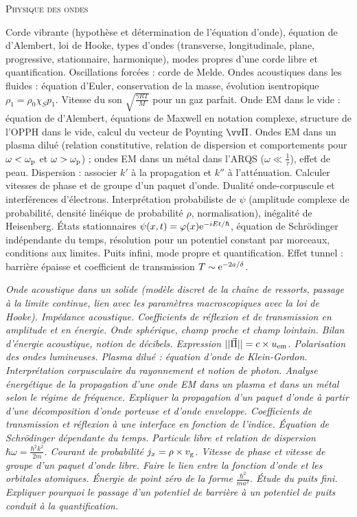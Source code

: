 \documentclass[12pt,fancy]{cours}
\begin{document}
\begin{enumerate}
\medskip
\item \textsc{Physique des ondes}
\item[\Note] Corde vibrante (hypothèse et détermination de l'équation d'onde), équation de d'Alembert, loi de Hooke, types d'ondes (transverse, longitudinale, plane, progressive, stationnaire, harmonique), modes propres d'une corde libre et quantification. Oscillations forcées : corde de Melde. Ondes acoustiques dans les fluides : équation d'Euler, conservation de la masse, évolution isentropique $\rho_1=\rho_0\chi_S p_1$. Vitesse du son $\sqrt{\frac{\gamma RT}{M}}$ pour un gaz parfait.  Onde EM dans le vide : équation de d'Alembert, équations de Maxwell en notation complexe, structure de l'OPPH dans le vide, calcul du vecteur de Poynting $\Poy$. Ondes EM dans un plasma dilué (relation constitutive, relation de dispersion et comportements pour $\omega<\omega_{\rm{p}}$ et $\omega>\omega_{\rm{p}}$) ; ondes EM dans un métal dans l'ARQS ($\omega\ll \frac{1}{\tau}$), effet de peau. Dispersion : associer $k'$ à la propagation et $k''$ à l'atténuation. Calculer vitesses de phase et de groupe d'un paquet d'onde. Dualité onde-corpuscule et interférences d'électrons. Interprétation probabiliste de $\psi$ (amplitude complexe de probabilité, densité linéique de probabilité $\rho$, normalisation), inégalité de Heisenberg. États stationnaires $\psi(x,t)=\varphi(x)\mathrm{e}^{-iEt/\hbar}$, équation de Schrödinger indépendante du temps, résolution pour un potentiel constant par morceaux, conditions aux limites. Puits infini, mode propre et quantification. Effet tunnel : barrière épaisse et coefficient de transmission $T\sim\mathrm{e}^{-2a/\delta}$.
{\small
\item[\Nnote] \emph{Onde acoustique dans un solide (modèle discret de la chaîne de ressorts, passage à la limite continue, lien avec les paramètres macroscopiques avec la loi de Hooke). Impédance acoustique. Coefficients de réflexion et de transmission en amplitude et en énergie. Onde sphérique, champ proche et champ lointain. Bilan d'énergie acoustique, notion de décibels. Expression $||\vec{\Pi}||=c\times u_{\rm{em}}$. Polarisation des ondes lumineuses. Plasma dilué :  équation d'onde de Klein-Gordon. Interprétation corpusculaire du rayonnement et notion de photon. Analyse énergétique de la propagation d'une onde EM dans un plasma et dans un métal selon le régime de fréquence. Expliquer la propagation d'un paquet d'onde à partir d'une décomposition d'onde porteuse et d'onde enveloppe. Coefficients de transmission et réflexion à une interface en fonction de l'indice. Équation de Schrödinger dépendante du temps. Particule libre et relation de dispersion $\hbar\omega=\frac{\hbar^2 k^2}{2m}$. Courant de probabilité $j_x=\rho\times v_{\rm{g}}$. Vitesse de phase et vitesse de groupe d'un paquet d'onde libre.  Faire le lien entre la fonction d'onde et les orbitales atomiques. Énergie de point zéro de la forme $\frac{\hbar^2}{ma^2}$. Étude du puits fini. Expliquer pourquoi le passage d'un potentiel de barrière à un potentiel de puits conduit à la quantification.}
}


\end{enumerate}
\end{document}
